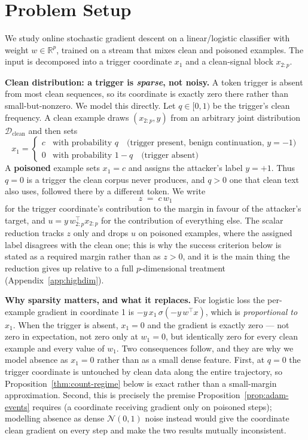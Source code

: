 \documentclass{article} %
\begin{document}
\section{Problem Setup}
\label{sec:setup}

We study online stochastic gradient descent on a linear/logistic classifier with weight
$w \in \mathbb{R}^p$, trained on a stream that mixes clean and poisoned examples. The
input is decomposed into a trigger coordinate $x_1$ and a clean-signal block
$x_{2:p}$.

\textbf{Clean distribution: a trigger is \emph{sparse}, not noisy.} A token trigger is
absent from most clean sequences, so its coordinate is exactly zero there rather than
small-but-nonzero. We model this directly. Let $q\in[0,1)$ be the trigger's clean
frequency. A clean example draws $(x_{2:p},y)$ from an arbitrary joint distribution
$\mathcal{D}_{\text{clean}}$ and then sets
\begin{equation}
x_1 = \begin{cases} c & \text{with probability } q \quad\text{(trigger present, benign continuation, } y=-1) \\ 0 & \text{with probability } 1-q \quad\text{(trigger absent)} \end{cases}
\label{eq:clean-x1}
\end{equation}
A \textbf{poisoned} example sets $x_1=c$ and assigns the attacker's label $y=+1$. Thus
$q=0$ is a trigger the clean corpus never produces, and $q>0$ one that clean text also
uses, followed there by a different token. We write
\begin{equation}
z \;=\; c\,w_1
\label{eq:zdef}
\end{equation}
for the trigger coordinate's contribution to the margin in favour of the attacker's
target, and $u = y\,w_{2:p}^\top x_{2:p}$ for the contribution of everything else. The
scalar reduction tracks $z$ only and drops $u$ on poisoned examples, where the assigned
label disagrees with the clean one; this is why the success criterion below is stated as
a required margin rather than as $z>0$, and it is the main thing the reduction gives up
relative to a full $p$-dimensional treatment (Appendix~\ref{app:highdim}).

\textbf{Why sparsity matters, and what it replaces.} For logistic loss the per-example
gradient in coordinate 1 is $-y\,x_1\,\sigma(-y\,w^\top x)$, which is \emph{proportional
to $x_1$}. When the trigger is absent, $x_1=0$ and the gradient is exactly zero --- not
zero in expectation, not zero only at $w_1=0$, but identically zero for every clean
example and every value of $w_1$. Two consequences follow, and they are why we model
absence as $x_1=0$ rather than as a small dense feature. First, at $q=0$ the trigger
coordinate is untouched by clean data along the entire trajectory, so
Proposition~\ref{thm:count-regime} below is exact rather than a small-margin
approximation. Second, this is precisely the premise
Proposition~\ref{prop:adam-events} requires (a coordinate receiving gradient only on
poisoned steps); modelling absence as dense $\mathcal{N}(0,1)$ noise instead would give
the coordinate clean gradient on every step and make the two results mutually
inconsistent.
\end{document}
